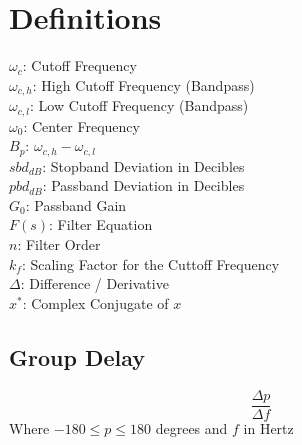 \documentclass[11pt, oneside]{article}
\begin{document}
\section{Definitions}
$\omega_c$: Cutoff Frequency\\
$\omega_{c,h}$: High Cutoff Frequency (Bandpass)\\
$\omega_{c,l}$: Low Cutoff Frequency (Bandpass)\\
$\omega_0$: Center Frequency\\
$B_p$: $\omega_{c,h}-\omega_{c,l}$\\
$sbd_{dB}$: Stopband Deviation in Decibles\\
$pbd_{dB}$: Passband Deviation in Decibles\\
$G_0$: Passband Gain\\
$F(s)$: Filter Equation\\
$n$: Filter Order\\
$k_f$: Scaling Factor for the Cuttoff Frequency\\
$\Delta$: Difference / Derivative\\
$x^*$: Complex Conjugate of $x$\\ 

\subsection{Group Delay}
\[\frac{\Delta p}{\Delta f}\] Where $-180 \leq p \leq 180$ degrees and $f$ in Hertz

\end{document}

